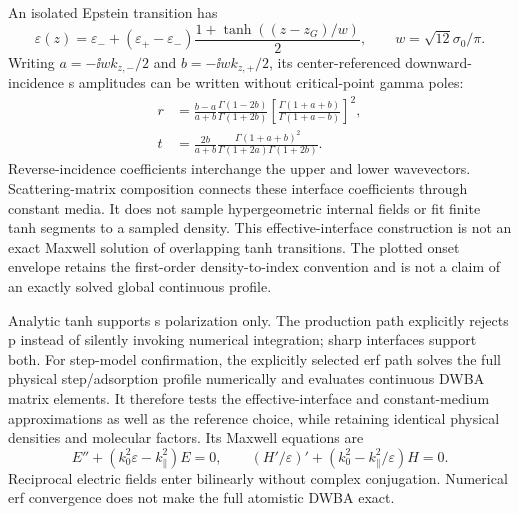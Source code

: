 An isolated Epstein transition has
\begin{equation}
 \varepsilon(z)=\varepsilon_-+
 (\varepsilon_+-\varepsilon_-)\frac{1+\tanh((z-z_G)/w)}{2},
 \qquad w=\sqrt{12}\sigma_0/\pi.
\end{equation}
Writing $a=-\ii w k_{z,-}/2$ and $b=-\ii w k_{z,+}/2$, its center-referenced
downward-incidence s amplitudes can be written without critical-point gamma poles:
\begin{align}
 r&=\frac{b-a}{a+b}\frac{\Gamma(1-2b)}{\Gamma(1+2b)}
       \left[\frac{\Gamma(1+a+b)}{\Gamma(1+a-b)}\right]^2,\\
 t&=\frac{2b}{a+b}
       \frac{\Gamma(1+a+b)^2}{\Gamma(1+2a)\Gamma(1+2b)}.
\end{align}
Reverse-incidence coefficients interchange the upper and lower wavevectors.
Scattering-matrix composition connects these interface coefficients through
constant media. It does not sample hypergeometric internal fields or fit finite
tanh segments to a sampled density. This effective-interface construction is
not an exact Maxwell solution of overlapping tanh transitions. The plotted
onset envelope retains the first-order density-to-index convention and is not
a claim of an exactly solved global continuous profile.

Analytic tanh supports s polarization only. The production path explicitly
rejects p instead of silently invoking numerical integration; sharp interfaces
support both. For step-model confirmation, the explicitly selected erf path
solves the full physical step/adsorption profile numerically and evaluates
continuous DWBA matrix elements. It therefore tests the effective-interface and
constant-medium approximations as well as the reference choice, while retaining
identical physical densities and molecular factors. Its Maxwell equations are
\begin{equation}
 E''+(k_0^2\varepsilon-k_\parallel^2)E=0,\qquad
 (H'/\varepsilon)' +(k_0^2-k_\parallel^2/\varepsilon)H=0.
\end{equation}
Reciprocal electric fields enter bilinearly without complex conjugation.
Numerical erf convergence does not make the full atomistic DWBA exact.
